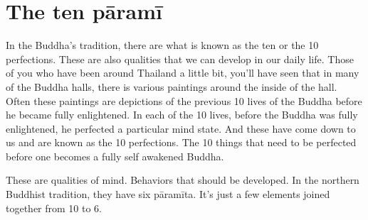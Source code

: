 \documentclass[letterpaper,10pt,english]{sphinxmanual}
\begin{document}
\section{The ten pāramī}
\label{\detokenize{7-b:the-ten-parami}}
\sphinxAtStartPar
In the Buddha’s tradition, there are what is known as the ten 
or the 10 perfections. These are also qualities that we can develop in our daily
life. Those of you who have been around Thailand a little bit, you’ll have
seen  that  in  many  of  the  Buddha  halls,  there  is  various  paintings  around
the inside of the hall. Often these paintings are depictions of the previous
10 lives of the Buddha before he became fully enlightened. In each of the
10 lives, before the Buddha was fully enlightened, he perfected a particular
mind state. And these have come down to us and are known as the 10 perfections. The 10 things that need to be perfected before one becomes a fully self
awakened Buddha.

\sphinxAtStartPar
These are qualities of mind. Behaviors that should be developed. In the
northern Buddhist tradition, they have six pāramīta. It’s just a few elements
joined together from 10 to 6.
\end{document}
